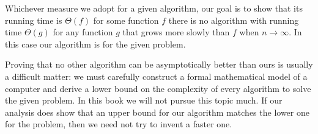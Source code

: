 Whichever measure we adopt for a given algorithm, our goal is  to show
that its running time is $\Theta(f)$ for some function $f$ 
there is no algorithm with running time $\Theta(g)$ for any function $g$
that grows more slowly than $f$ when $n \rightarrow \infty$. In this case
our algorithm is  for the given problem.

Proving that no other algorithm can be asymptotically better than
ours is usually a difficult matter: we must carefully construct a
formal mathematical model of a computer and derive a lower bound on the
complexity of every algorithm to solve the given problem. In this book
we will not pursue this topic much. If our analysis does show that an
upper bound for our algorithm matches the lower one for the problem,
then we need not try to invent a faster one.
